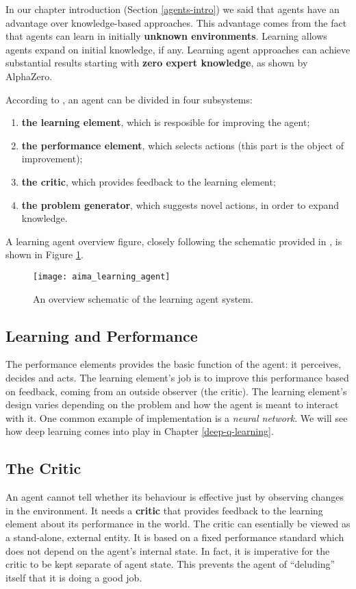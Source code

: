 In our chapter introduction (Section \ref{agents-intro}) we said that agents have an advantage over knowledge-based approaches.
This advantage comes from the fact that agents can learn in initially \textbf{unknown environments}.
Learning allows agents expand on initial knowledge, if any.
Learning agent approaches can achieve substantial results starting with \textbf{zero expert knowledge}, as shown by AlphaZero\cite{alpha-zero}.

According to \cite{aima}, an agent can be divided in four subsystems:
\begin{enumerate}
    \item \textbf{the learning element}, which is resposible for improving the agent;
    \item \textbf{the performance element}, which selects actions (this part is the object of improvement);
    \item \textbf{the critic}, which provides feedback to the learning element;
    \item \textbf{the problem generator}, which suggests novel actions, in order to expand knowledge.    
\end{enumerate}

A learning agent overview figure, closely following the schematic provided in \cite{aima}, is shown in Figure \ref{fig:aima-learning-agent}.

\begin{figure}[ht]
    \texttt{[image: aima\_learning\_agent]}
    \centering
    \caption{An overview schematic of the learning agent system.}
    \label{fig:aima-learning-agent}
\end{figure}

\subsection{Learning and Performance}
The performance elements provides the basic function of the agent: it perceives, decides and acts.
The learning element's job is to improve this performance based on feedback, coming from an outside observer (the critic).
The learning element's design varies depending on the problem and how the agent is meant to interact with it.
One common example of implementation is a \emph{neural network}.
We will see how deep learning comes into play in Chapter \ref{deep-q-learning}.

\subsection{The Critic}
An agent cannot tell whether its behaviour is effective just by observing changes in the environment.
It needs a \textbf{critic} that provides feedback to the learning element about its performance in the world.
The critic can esentially be viewed as a stand-alone, external entity.
It is based on a fixed performance standard which does not depend on the agent's internal state.
In fact, it is imperative for the critic to be kept separate of agent state.
This prevents the agent of ``deluding'' itself that it is doing a good job.

